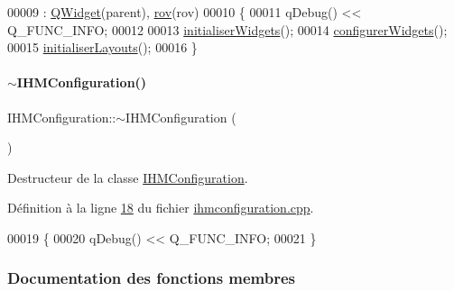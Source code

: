 \begin{DoxyCode}
00009                                                             : \hyperlink{class_q_widget}{QWidget}(parent), 
      \hyperlink{class_i_h_m_configuration_a75a7e5b7312d9eb3377bc96372fc0b3a}{rov}(rov)
00010 \{
00011     qDebug() << Q\_FUNC\_INFO;
00012 
00013     \hyperlink{class_i_h_m_configuration_a76fe56bbd88aef5581186e05fb4ae67f}{initialiserWidgets}();
00014     \hyperlink{class_i_h_m_configuration_a9ed73ca9584b8d9f33ad341081113a55}{configurerWidgets}();
00015     \hyperlink{class_i_h_m_configuration_ab76abe78fff3b7945b675acddbd320f0}{initialiserLayouts}();
00016 \}
\end{DoxyCode}
\mbox{\label{class_i_h_m_configuration_a59e2b693b4a1f1a8a6af3227996c3808}} 
\paragraph{\texorpdfstring{$\sim$\+I\+H\+M\+Configuration()}{~IHMConfiguration()}}
{\footnotesize\ttfamily I\+H\+M\+Configuration\+::$\sim$\+I\+H\+M\+Configuration (\begin{DoxyParamCaption}{ }\end{DoxyParamCaption})}



Destructeur de la classe \hyperlink{class_i_h_m_configuration}{I\+H\+M\+Configuration}. 



Définition à la ligne \hyperlink{ihmconfiguration_8cpp_source_l00018}{18} du fichier \hyperlink{ihmconfiguration_8cpp_source}{ihmconfiguration.\+cpp}.


\begin{DoxyCode}
00019 \{
00020     qDebug() << Q\_FUNC\_INFO;
00021 \}
\end{DoxyCode}


\subsubsection{Documentation des fonctions membres}
\mbox{\label{class_i_h_m_configuration_a9ed73ca9584b8d9f33ad341081113a55}} 
